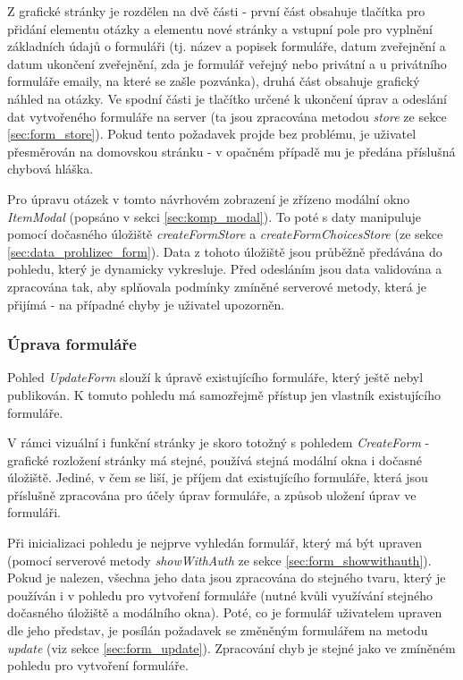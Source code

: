 		Z grafické stránky je rozdělen na dvě části - první část obsahuje tlačítka pro přidání elementu otázky a elementu nové stránky a vstupní pole pro vyplnění základních údajů o formuláři (tj. název a popisek formuláře, datum zveřejnění a datum ukončení zveřejnění, zda je formulář veřejný nebo privátní a u privátního formuláře emaily, na které se zašle pozvánka), druhá část obsahuje grafický náhled na otázky. Ve spodní části je tlačítko určené k ukončení úprav a odeslání dat vytvořeného formuláře na server (ta jsou zpracována metodou \textit{store} ze sekce \ref{sec:form_store}). Pokud tento požadavek projde bez problému, je uživatel přesměrován na domovskou stránku - v opačném případě mu je předána příslušná chybová hláška.
		
		Pro úpravu otázek v tomto návrhovém zobrazení je zřízeno modální okno \textit{ItemModal} (popsáno v sekci \ref{sec:komp_modal}). To poté s daty manipuluje pomocí dočasného úložiště \textit{createFormStore} a \textit{createFormChoicesStore} (ze sekce \ref{sec:data_prohlizec_form}). Data z tohoto úložiště jsou průběžně předávána do pohledu, který je dynamicky vykresluje. Před odesláním jsou data validována a zpracována tak, aby splňovala podmínky zmíněné serverové metody, která je přijímá - na případné chyby je uživatel upozorněn.
		
		\subsubsection{Úprava formuláře}\label{sec:pohled_uprava_formulare} %
		Pohled \textit{UpdateForm} slouží k úpravě existujícího formuláře, který ještě nebyl publikován. K tomuto pohledu má samozřejmě přístup jen vlastník existujícího formuláře.
		
		V rámci vizuální i funkční stránky je skoro totožný s pohledem \textit{CreateForm} - grafické rozložení stránky má stejné, používá stejná modální okna i dočasné úložiště. Jediné, v čem se liší, je příjem dat existujícího formuláře, která jsou příslušně zpracována pro účely úprav formuláře, a způsob uložení úprav ve formuláři.
		
		Při inicializaci pohledu je nejprve vyhledán formulář, který má být upraven (pomocí serverové metody \textit{showWithAuth} ze sekce \ref{sec:form_showwithauth}). Pokud je nalezen, všechna jeho data jsou zpracována do stejného tvaru, který je používán i v pohledu pro vytvoření formuláře (nutné kvůli využívání stejného dočasného úložiště a modálního okna). Poté, co je formulář uživatelem upraven dle jeho představ, je posílán požadavek se změněným formulářem na metodu \textit{update} (viz sekce \ref{sec:form_update}). Zpracování chyb je stejné jako ve zmíněném pohledu pro vytvoření formuláře.
		
